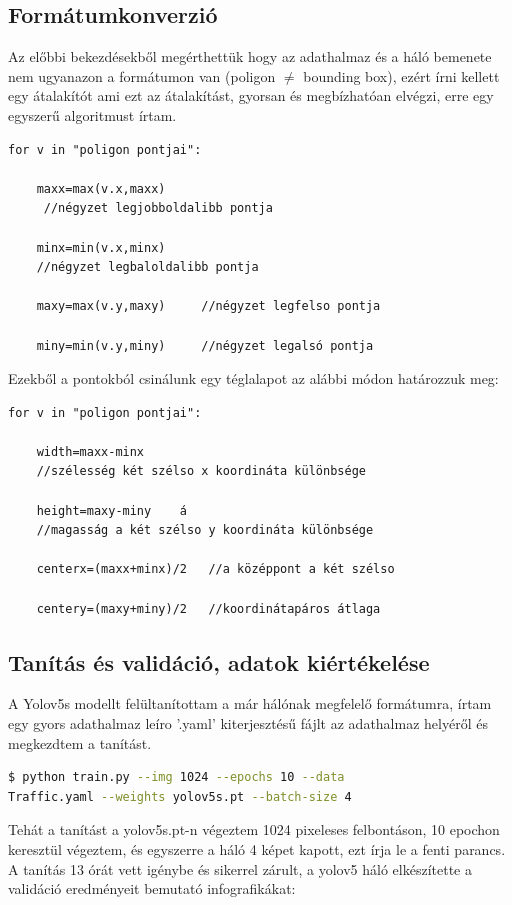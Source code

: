 \documentclass[12pt,oneside,a4paper]{article}
\theoremstyle{remark}
\begin{document}
\newpage
\subsection{Formátumkonverzió}\label{subsec:formatumkonverzio}
Az előbbi bekezdésekből megérthettük hogy az adathalmaz és a háló bemenete nem ugyanazon a formátumon van (poligon $\neq$ bounding box),
ezért írni kellett egy átalakítót ami ezt az átalakítást, gyorsan és megbízhatóan elvégzi, erre egy egyszerű algoritmust írtam.
\newline
\begin{verbatim}
for v in "poligon pontjai":

    maxx=max(v.x,maxx)     
     //négyzet legjobboldalibb pontja

    minx=min(v.x,minx)      
    //négyzet legbaloldalibb pontja

    maxy=max(v.y,maxy)     //négyzet legfelso pontja

    miny=min(v.y,miny)     //négyzet legalsó pontja
\end{verbatim}
Ezekből a pontokból csinálunk egy téglalapot az alábbi módon határozzuk meg:

\begin{verbatim}
for v in "poligon pontjai":

    width=maxx-minx     
    //szélesség két szélso x koordináta különbsége

    height=maxy-miny    á
    //magasság a két szélso y koordináta különbsége

    centerx=(maxx+minx)/2   //a középpont a két szélso
    
    centery=(maxy+miny)/2   //koordinátapáros átlaga

\end{verbatim}
\newpage
\subsection{Tanítás és validáció, adatok kiértékelése}\label{subsec:tanitas-es-validacio-adatok-kiertekelese}
A Yolov5s modellt felültanítottam a már hálónak megfelelő formátumra, írtam egy gyors adathalmaz leíro '.yaml'
kiterjesztésű fájlt az adathalmaz helyéről és megkezdtem a tanítást.

\begin{lstlisting}[language=bash,label={lst:lstlisting}]
$ python train.py --img 1024 --epochs 10 --data 
Traffic.yaml --weights yolov5s.pt --batch-size 4
\end{lstlisting}
Tehát a tanítást a yolov5s.pt-n végeztem 1024 pixeleses felbontáson, 10 epochon keresztül végeztem, és egyszerre
a háló 4 képet kapott, ezt írja le a fenti parancs.
A tanítás 13 órát vett igénybe és sikerrel zárult, a yolov5 háló elkészítette a validáció eredményeit bemutató infografikákat:
\end{document}
